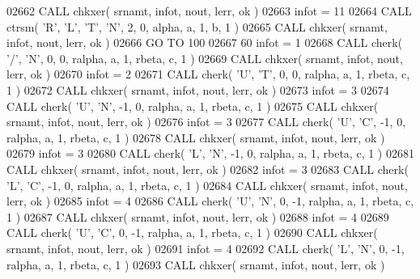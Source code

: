 \begin{DoxyCode}
02662       \textcolor{keyword}{CALL }chkxer( srnamt, infot, nout, lerr, ok )
02663       infot = 11
02664       \textcolor{keyword}{CALL }ctrsm( \textcolor{stringliteral}{'R'}, \textcolor{stringliteral}{'L'}, \textcolor{stringliteral}{'T'}, \textcolor{stringliteral}{'N'}, 2, 0, alpha, a, 1, b, 1 )
02665       \textcolor{keyword}{CALL }chkxer( srnamt, infot, nout, lerr, ok )
02666       \textcolor{keywordflow}{GO TO} 100
02667    60 infot = 1
02668       \textcolor{keyword}{CALL }cherk( \textcolor{stringliteral}{'/'}, \textcolor{stringliteral}{'N'}, 0, 0, ralpha, a, 1, rbeta, c, 1 )
02669       \textcolor{keyword}{CALL }chkxer( srnamt, infot, nout, lerr, ok )
02670       infot = 2
02671       \textcolor{keyword}{CALL }cherk( \textcolor{stringliteral}{'U'}, \textcolor{stringliteral}{'T'}, 0, 0, ralpha, a, 1, rbeta, c, 1 )
02672       \textcolor{keyword}{CALL }chkxer( srnamt, infot, nout, lerr, ok )
02673       infot = 3
02674       \textcolor{keyword}{CALL }cherk( \textcolor{stringliteral}{'U'}, \textcolor{stringliteral}{'N'}, -1, 0, ralpha, a, 1, rbeta, c, 1 )
02675       \textcolor{keyword}{CALL }chkxer( srnamt, infot, nout, lerr, ok )
02676       infot = 3
02677       \textcolor{keyword}{CALL }cherk( \textcolor{stringliteral}{'U'}, \textcolor{stringliteral}{'C'}, -1, 0, ralpha, a, 1, rbeta, c, 1 )
02678       \textcolor{keyword}{CALL }chkxer( srnamt, infot, nout, lerr, ok )
02679       infot = 3
02680       \textcolor{keyword}{CALL }cherk( \textcolor{stringliteral}{'L'}, \textcolor{stringliteral}{'N'}, -1, 0, ralpha, a, 1, rbeta, c, 1 )
02681       \textcolor{keyword}{CALL }chkxer( srnamt, infot, nout, lerr, ok )
02682       infot = 3
02683       \textcolor{keyword}{CALL }cherk( \textcolor{stringliteral}{'L'}, \textcolor{stringliteral}{'C'}, -1, 0, ralpha, a, 1, rbeta, c, 1 )
02684       \textcolor{keyword}{CALL }chkxer( srnamt, infot, nout, lerr, ok )
02685       infot = 4
02686       \textcolor{keyword}{CALL }cherk( \textcolor{stringliteral}{'U'}, \textcolor{stringliteral}{'N'}, 0, -1, ralpha, a, 1, rbeta, c, 1 )
02687       \textcolor{keyword}{CALL }chkxer( srnamt, infot, nout, lerr, ok )
02688       infot = 4
02689       \textcolor{keyword}{CALL }cherk( \textcolor{stringliteral}{'U'}, \textcolor{stringliteral}{'C'}, 0, -1, ralpha, a, 1, rbeta, c, 1 )
02690       \textcolor{keyword}{CALL }chkxer( srnamt, infot, nout, lerr, ok )
02691       infot = 4
02692       \textcolor{keyword}{CALL }cherk( \textcolor{stringliteral}{'L'}, \textcolor{stringliteral}{'N'}, 0, -1, ralpha, a, 1, rbeta, c, 1 )
02693       \textcolor{keyword}{CALL }chkxer( srnamt, infot, nout, lerr, ok )

\end{DoxyCode}
